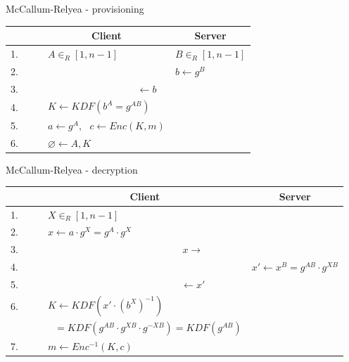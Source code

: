 \documentclass[ignorenonframetext,aspectratio=169]{beamer}
\begin{document}
\begin{frame}{McCallum-Relyea - provisioning}
\protect\hypertarget{mccallum-relyea-provisioning}{}

\begin{center}
\def\arraystretch{1.5}%
\begin{tabular}{ l l l }
    ~ & \multicolumn{1}{c}{Client} & \multicolumn{1}{c}{Server} \\ \hline
    {\small 1.~~~~} & $A \in_R [1, n-1]$ & $B \in_R [1, n-1]$ \\
    {\small 2.~~~~} &                    & $b \gets g^B$ \\
    {\small 3.~~~~} & \multicolumn{2}{c}{$ \gets b $} \\
    {\small 4.~~~~} & $ K \gets KDF(b^A = g^{AB}) $ & \\
    {\small 5.~~~~} & $ a \gets g^A,~~~c \gets Enc(K, m) $ & \\
    {\small 6.~~~~} & $ \varnothing \gets A, K $ & \\
\end{tabular}
\end{center}

\end{frame}

\begin{frame}{McCallum-Relyea - decryption}
\protect\hypertarget{mccallum-relyea---decryption}{}

\begin{center}
\def\arraystretch{1.5}%
\begin{tabular}{ l l l }
  ~ & \multicolumn{1}{c}{Client} & \multicolumn{1}{c}{Server} \\ \hline
 {\small 1.~~~~} &  $X \in_R [1, n-1]$ & \\
 {\small 2.~~~~} &  $ x \gets a \cdot g^X = g^A \cdot g^X $ & \\
 {\small 3.~~~~} &  \multicolumn{2}{c}{$ x \to $} \\
 {\small 4.~~~~} &  & $x' \gets x^B = g^{AB} \cdot g^{XB} $ \\
 {\small 5.~~~~} &  \multicolumn{2}{c}{$ \gets x' $} \\
 {\small 6.~~~~} &  $ K \gets KDF(x' \cdot (b^X)^{-1}) $ & \\
        ~        &  $ ~~~ = KDF(g^{AB} \cdot g^{XB} \cdot g^{-XB}) = KDF(g^{AB}) $ & \\
 {\small 7.~~~~} &  $ m \gets Enc^{-1}(K, c) $ & \\
\end{tabular}
\end{center}

\end{frame}
\end{document}
